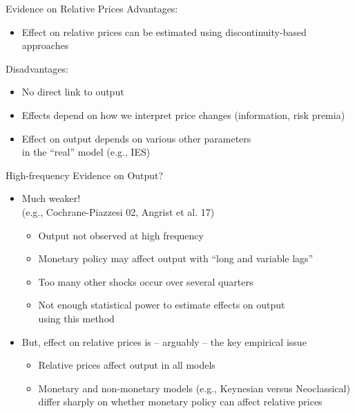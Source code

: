 \documentclass[11pt,aspectratio=169,xcolor={dvipsnames},hyperref={pdftex,pdfpagemode=UseNone,hidelinks,pdfdisplaydoctitle=true},usepdftitle=false]{beamer}
\begin{document}
\begin{frame}{Evidence on Relative Prices}
Advantages:
\begin{itemize}
\item Effect on relative prices can be estimated using discontinuity-based approaches
\end{itemize} \pause


\vspace{15pt}
Disadvantages: 
\begin{itemize}
\item No direct link to output
\item Effects depend on how we interpret price changes \linebreak (information, risk premia) 
\item Effect on output depends on various other parameters \\ in the ``real'' model (e.g., IES)  
\end{itemize} 
\end{frame}


\begin{frame}{High-frequency Evidence on Output?}
\begin{itemize}
\itemsep1em
\item Much weaker! \\ {\small (e.g., Cochrane-Piazzesi 02, Angrist et al. 17)}
\begin{itemize}
\item Output not observed at high frequency
\item Monetary policy  may affect output with ``long and variable lags'' 
\item Too many other shocks occur over several quarters
\item Not enough statistical power to estimate effects on output \\ using this method 
\end{itemize} \pause 
\item But, effect on relative prices is -- arguably -- the key empirical issue
\begin{itemize}
\item Relative prices affect output in all models
\item Monetary and non-monetary models (e.g., Keynesian versus Neoclassical) differ sharply on whether monetary policy can affect relative prices
\end{itemize}
\end{itemize}
\end{frame}
\end{document}
